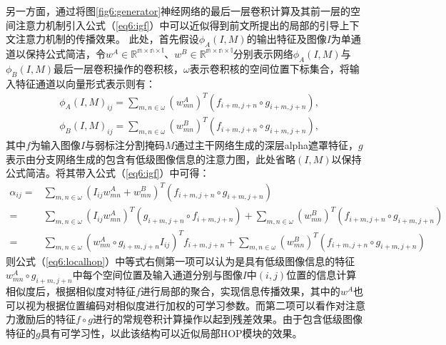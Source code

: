 另一方面，通过将图\ref{fig6:generator}神经网络的最后一层卷积计算及其前一层的空间注意力机制引入公式（\ref{eq6:igf}）中可以近似得到前文所提出的局部的引导上下文注意力机制的传播效果。
此处，首先假设$ \phi_{A}(I, M) $的输出特征及图像$I$为单通道以保持公式简洁，令$w^A\in \mathbb{R^{m\times n\times l}}$、$w^B\in \mathbb{R^{m\times n\times l}}$分别表示网络$ \phi_{A}(I, M) $与$ \phi_{B}(I, M) $最后一层卷积操作的卷积核，$\omega$表示卷积核的空间位置下标集合，将输入特征通道以向量形式表示则有：
\begin{equation}
	\begin{aligned}
	&\phi_{A}(I, M)_{ij} = \sum_{m,n\in \omega} (w^A_{mn})^T(f_{i+m,j+n}\circ g_{i+m,j+n}), \\&\phi_{B}(I, M)_{ij} = \sum_{m,n\in \omega} (w^B_{mn})^T(f_{i+m,j+n}\circ g_{i+m,j+n}),
	\end{aligned}
\end{equation}
其中$f$为输入图像$I$与弱标注分割掩码$M$通过主干网络生成的深层alpha遮罩特征，$g$表示由分支网络生成的包含有低级图像信息的注意力图，此处省略$(I,M)$以保持公式简洁。将其带入公式（\ref{eq6:igf}）中可得：
\begin{equation}
	\begin{aligned}
	\alpha_{ij} =& \sum_{m,n\in \omega} (I_{ij}w^A_{mn}+w^B_{mn})^T(f_{i+m,j+n}\circ g_{i+m,j+n})\\
	=& \sum_{m,n\in \omega} (I_{ij}w^A_{mn})^T(g_{i+m,j+n}\circ f_{i+m,j+n}) + \sum_{m,n\in \omega} (w^B_{mn})^T(f_{i+m,j+n}\circ g_{i+m,j+n})\\
	=& \sum_{m,n\in \omega} (w^A_{mn}\circ g_{i+m,j+n}I_{ij})^Tf_{i+m,j+n} + \sum_{m,n\in \omega} (w^B_{mn})^T(f_{i+m,j+n}\circ g_{i+m,j+n})
	\end{aligned}
	\label{eq6:localhop}
\end{equation}
则公式（\ref{eq6:localhop}）中等式右侧第一项可以认为是具有低级图像信息的特征$w^A_{mn}\circ g_{i+m,j+n}$中每个空间位置及输入通道分别与图像$I$中$(i,j)$位置的信息计算相似度后，根据相似度对特征$f$进行局部的聚合，实现信息传播效果，其中的$w^A$也可以视为根据位置编码对相似度进行加权的可学习参数。而第二项可以看作对注意力激励后的特征$f\circ g$进行的常规卷积计算操作以起到残差效果。由于包含低级图像特征的$g$具有可学习性，以此该结构可以近似局部HOP模块的效果。

